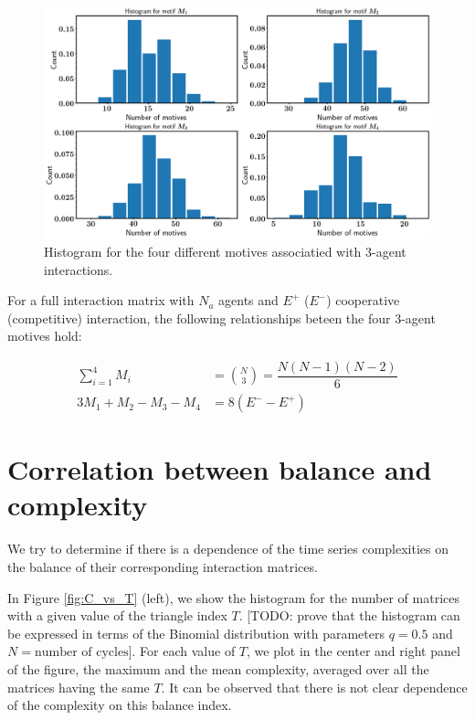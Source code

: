 \documentclass[10pt]{article}
\begin{document}
\begin{figure}[H]
	\centering
\includegraphics[scale=0.28]{../figs/motives_histogram.png}
	\caption{Histogram for the four different motives associatied with 3-agent interactions. \label{fig:motives_hist}}
\end{figure}

For a full interaction matrix with $N_a$ agents and $E^+$ ($E^-$) cooperative (competitive) interaction, the following relationships beteen the four 3-agent motives hold:

\begin{align*}
\sum_{i=1}^4 M_i &= \binom{N}{3} = \dfrac{N(N-1)(N-2)}{6} \\
3 M_1 + M_2 - M_3 - M_4 &= 8(E^- - E^+)
\end{align*}


\section{Correlation between balance and complexity}

We try to determine if there is a dependence of the time series complexities on the balance of their corresponding interaction matrices. 

In Figure \ref{fig:C_vs_T} (left), we show the histogram for the number of matrices with a given value of the triangle index $T$. [TODO: prove that the histogram can be expressed in terms of the Binomial distribution with parameters $q = 0.5$ and $N = \text{number of cycles}$]. For each value of $T$, we plot in the center and right panel of the figure, the maximum and the mean complexity, averaged over all the matrices having the same $T$. It can be observed that there is not clear dependence of the complexity on this balance index. 
\end{document}
